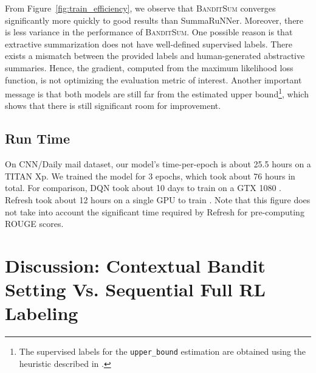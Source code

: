 \documentclass[11pt,a4paper]{article}
\newcommand{\B}{\textsc{BanditSum }}
\newcommand{\Bnospace}{\textsc{BanditSum}}
\begin{document}
From Figure~\ref{fig:train_efficiency}, we observe that \B converges significantly more quickly to good results than SummaRuNNer. Moreover, there is less variance in the performance of \Bnospace. One possible reason is that extractive summarization does not have well-defined supervised labels. There exists a mismatch between the provided labels and human-generated abstractive summaries. Hence, the gradient, computed from the maximum likelihood loss function, is not optimizing the evaluation metric of interest. Another important message is that both models are still far from the estimated upper bound\footnote{The supervised labels for the \texttt{upper\_bound} estimation are obtained using the heuristic described in \citet{ext5_summarunner}.}, which shows that there is still significant room for improvement.






\subsection{Run Time}
On CNN/Daily mail dataset, our model's time-per-epoch is about 25.5 hours on a TITAN Xp. We trained the model for 3 epochs, which took about 76 hours in total. For comparison, DQN took about 10 days to train on a GTX 1080 \citep{yao2018deep}. Refresh took about 12 hours on a single GPU to train \citep{DBLP:Narayan/2018}. Note that this figure does not take into account the significant time required by Refresh for pre-computing ROUGE scores.





\section{Discussion: Contextual Bandit Setting Vs. Sequential Full RL Labeling \label{sec:discussion}}
\end{document}
